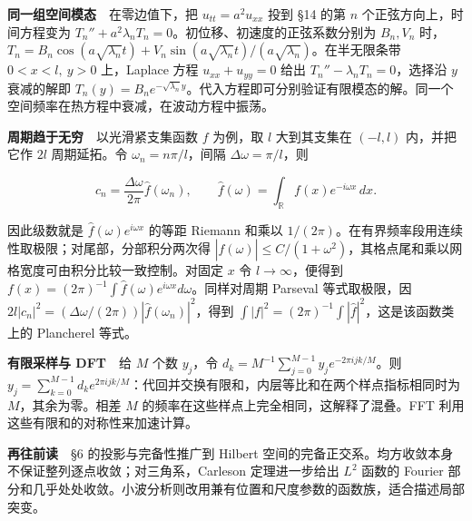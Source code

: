 \documentclass[12pt,a4paper]{article}
\begin{document}
\textbf{同一组空间模态}　在零边值下，把 \(u_{tt}=a^2u_{xx}\) 投到 §14 的第 \(n\) 个正弦方向上，时间方程变为 \(T_n''+a^2\lambda_nT_n=0\)。初位移、初速度的正弦系数分别为 \(B_n,V_n\) 时，\(T_n=B_n\cos(a\sqrt{\lambda_n}t)+V_n\sin(a\sqrt{\lambda_n}t)/(a\sqrt{\lambda_n})\)。在半无限条带 \(0<x<l,\ y>0\) 上，Laplace 方程 \(u_{xx}+u_{yy}=0\) 给出 \(T_n''-\lambda_n T_n=0\)，选择沿 \(y\) 衰减的解即 \(T_n(y)=B_ne^{-\sqrt{\lambda_n}y}\)。代入方程即可分别验证有限模态的解。同一个空间频率在热方程中衰减，在波动方程中振荡。

\textbf{周期趋于无穷}　以光滑紧支集函数 \(f\) 为例，取 \(l\) 大到其支集在 \((-l,l)\) 内，并把它作 \(2l\) 周期延拓。令 \(\omega_n=n\pi/l\)，间隔 \(\Delta\omega=\pi/l\)，则

\[
 c_n=\frac{\Delta\omega}{2\pi}\widehat f(\omega_n),\qquad
 \widehat f(\omega)=\int_{\mathbb R} f(x)e^{-i\omega x}\,dx .
\]

因此级数就是 \(\widehat f(\omega)e^{i\omega x}\) 的等距 Riemann 和乘以 \(1/(2\pi)\)。在有界频率段用连续性取极限；对尾部，分部积分两次得 \(|\widehat f(\omega)|\le C/(1+\omega^2)\)，其格点尾和乘以网格宽度可由积分比较一致控制。对固定 \(x\) 令 \(l\to\infty\)，便得到 \(f(x)=(2\pi)^{-1}\int\widehat f(\omega)e^{i\omega x}d\omega\)。同样对周期 Parseval 等式取极限，因 \(2l|c_n|^2=(\Delta\omega/(2\pi))|\widehat f(\omega_n)|^2\)，得到 \(\int |f|^2=(2\pi)^{-1}\int|\widehat f|^2\)，这是该函数类上的 Plancherel 等式。

\textbf{有限采样与 DFT}　给 \(M\) 个数 \(y_j\)，令 \(d_k=M^{-1}\sum_{j=0}^{M-1}y_j e^{-2\pi i jk/M}\)。则 \(y_j=\sum_{k=0}^{M-1} d_ke^{2\pi i jk/M}\)：代回并交换有限和，内层等比和在两个样点指标相同时为 \(M\)，其余为零。相差 \(M\) 的频率在这些样点上完全相同，这解释了混叠。FFT 利用这些有限和的对称性来加速计算。

\textbf{再往前读}　§6 的投影与完备性推广到 Hilbert 空间的完备正交系。均方收敛本身不保证整列逐点收敛；对三角系，Carleson 定理进一步给出 \(L^2\) 函数的 Fourier 部分和几乎处处收敛。小波分析则改用兼有位置和尺度参数的函数族，适合描述局部突变。
\end{document}
